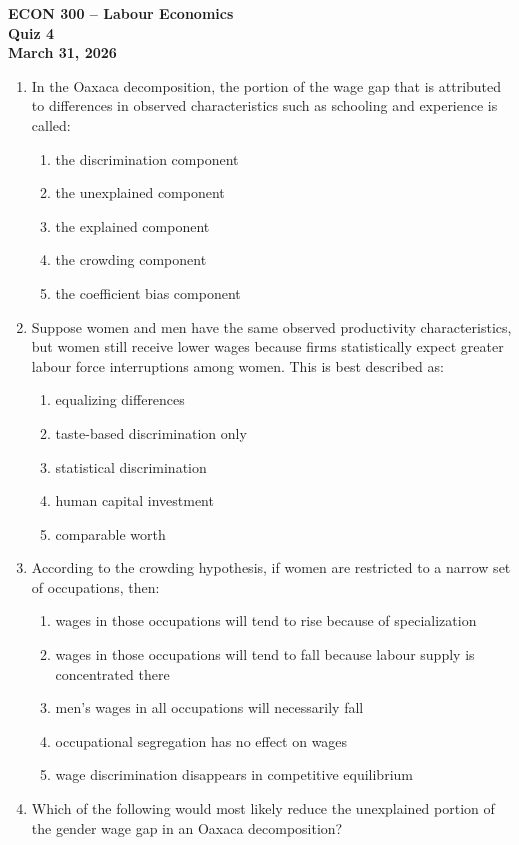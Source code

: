 \documentclass[12pt]{article}
\begin{document}
\begin{center}
\Large \textbf{ECON 300 -- Labour Economics} \vspace{.5cm}\\
\large \textbf{Quiz 4} \vspace{.5cm}\\
\large \textbf{March 31, 2026}
\end{center}

\begin{enumerate}[label=\textbf{\arabic*.}]

\item In the Oaxaca decomposition, the portion of the wage gap that is attributed to differences in observed characteristics such as schooling and experience is called:

\begin{enumerate}[label=\Alph*)]
    \item the discrimination component
    \item the unexplained component
    \item the explained component
    \item the crowding component
    \item the coefficient bias component
\end{enumerate}

\item Suppose women and men have the same observed productivity characteristics, but women still receive lower wages because firms statistically expect greater labour force interruptions among women. This is best described as:

\begin{enumerate}[label=\Alph*)]
    \item equalizing differences
    \item taste-based discrimination only
    \item statistical discrimination
    \item human capital investment
    \item comparable worth
\end{enumerate}

\item According to the crowding hypothesis, if women are restricted to a narrow set of occupations, then:

\begin{enumerate}[label=\Alph*)]
    \item wages in those occupations will tend to rise because of specialization
    \item wages in those occupations will tend to fall because labour supply is concentrated there
    \item men’s wages in all occupations will necessarily fall
    \item occupational segregation has no effect on wages
    \item wage discrimination disappears in competitive equilibrium
\end{enumerate}
\newpage
\item Which of the following would most likely reduce the unexplained portion of the gender wage gap in an Oaxaca decomposition?


\end{enumerate}
\end{document}

